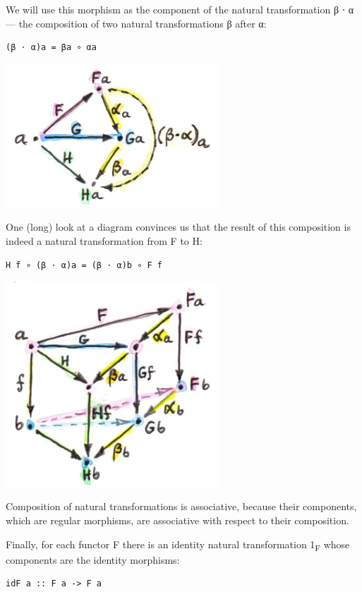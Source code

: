 We will use this morphism as the component of the natural transformation
β ⋅ α --- the composition of two natural transformations β after α:

\begin{verbatim}
(β ⋅ α)a = βa ∘ αa
\end{verbatim}

\includegraphics[width=3.12500in]{images/5_vertical.jpg}

One (long) look at a diagram convinces us that the result of this
composition is indeed a natural transformation from F to H:

\begin{verbatim}
H f ∘ (β ⋅ α)a = (β ⋅ α)b ∘ F f
\end{verbatim}

\includegraphics[width=3.12500in]{images/6_verticalnaturality.jpg}

Composition of natural transformations is associative, because their
components, which are regular morphisms, are associative with respect to
their composition.

Finally, for each functor F there is an identity natural transformation
1\textsubscript{F} whose components are the identity morphisms:

\begin{verbatim}
idF a :: F a -> F a
\end{verbatim}

